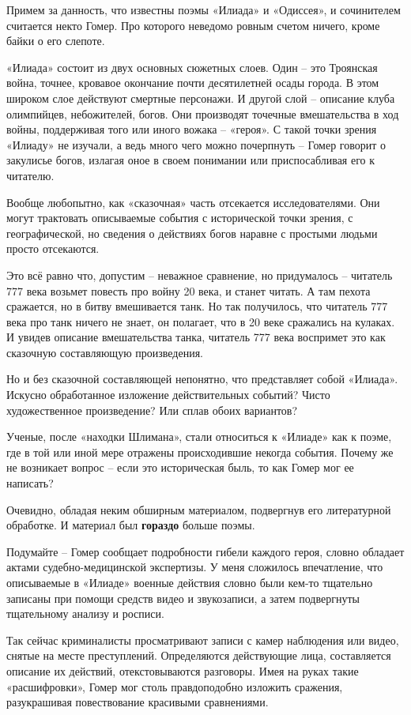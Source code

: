 Примем за данность, что известны поэмы «Илиада» и «Одиссея», и сочинителем считается некто Гомер. Про которого неведомо ровным счетом ничего, кроме байки о его слепоте.

«Илиада» состоит из двух основных сюжетных слоев. Один – это Троянская война, точнее, кровавое окончание почти десятилетней осады города. В этом широком слое действуют смертные персонажи. И другой слой – описание клуба олимпийцев, небожителей, богов. Они производят точечные вмешательства в ход войны, поддерживая того или иного вожака – «героя». С такой точки зрения «Илиаду» не изучали, а ведь много чего можно почерпнуть – Гомер говорит о закулисье богов, излагая оное в своем понимании или приспосабливая его к читателю.

Вообще любопытно, как «сказочная» часть отсекается исследователями. Они могут трактовать описываемые события с исторической точки зрения, с географической, но сведения о действиях богов наравне с простыми людьми просто отсекаются.

Это всё равно что, допустим – неважное сравнение, но придумалось – читатель 777 века возьмет повесть про войну 20 века, и станет читать. А там пехота сражается, но в битву вмешивается танк. Но так получилось, что читатель 777 века про танк ничего не знает, он полагает, что в 20 веке сражались на кулаках. И увидев описание вмешательства танка, читатель 777 века воспримет это как сказочную составляющую произведения.

Но и без сказочной составляющей непонятно, что представляет собой «Илиада». Искусно обработанное изложение действительных событий? Чисто художественное произведение? Или сплав обоих вариантов?

Ученые, после «находки Шлимана», стали относиться к «Илиаде» как к поэме, где в той или иной мере отражены происходившие некогда события. Почему же не возникает вопрос – если это историческая быль, то как Гомер мог ее написать? 

Очевидно, обладая неким обширным материалом, подвергнув его литературной обработке. И материал был \textbf{гораздо} больше поэмы.

Подумайте – Гомер сообщает подробности гибели каждого героя, словно обладает актами судебно-медицин\-ской экспертизы. У меня сложилось впечатление, что описываемые в «Илиаде» военные действия словно были кем-то тщательно записаны при помощи средств видео и звукозаписи, а затем подвергнуты тщательному анализу и росписи. 

Так сейчас криминалисты просматривают записи с камер наблюдения или видео, снятые на месте преступлений. Определяются действующие лица, составляется описание их действий, отекстовываются разговоры. Имея на руках такие «расшифровки», Гомер мог столь правдоподобно изложить сражения, разукрашивая повествование красивыми сравнениями.\\

